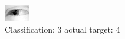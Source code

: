 \begin{figure}[h!]
\begin{center}
\includegraphics[width=0.60\columnwidth]{figures/ID2471_class_3_target_4.png}
\end{center}
\caption{ Classification: 3 actual target: 4}
\label{fig:ID2471_class_3_target_4}
\end{figure}

